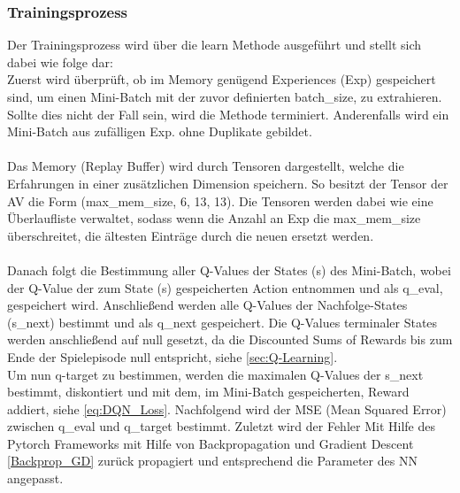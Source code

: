 \subsubsection{Trainingsprozess}
Der Trainingsprozess wird über die learn Methode ausgeführt und stellt sich dabei wie folge dar:\\
Zuerst wird überprüft, ob im Memory genügend Experiences (Exp) gespeichert sind, um einen Mini-Batch mit der zuvor definierten batch\_size, zu extrahieren. Sollte dies nicht der Fall sein, wird die Methode terminiert. Anderenfalls wird ein Mini-Batch aus zufälligen Exp. ohne Duplikate gebildet.\\
\\Das Memory (Replay Buffer) wird durch Tensoren dargestellt, welche die Erfahrungen in einer zusätzlichen Dimension speichern. So besitzt der Tensor der AV die Form (max\_mem\_size, 6, 13, 13). Die Tensoren werden dabei wie eine Überlaufliste verwaltet, sodass wenn die Anzahl an Exp die max\_mem\_size überschreitet, die ältesten Einträge durch die neuen ersetzt werden.\\
\\Danach folgt die Bestimmung aller Q-Values der States (s) des Mini-Batch, wobei der Q-Value der zum State (s) gespeicherten Action entnommen und als q\_eval, gespeichert wird. 
Anschließend werden alle Q-Values der Nachfolge-States (s\_next) bestimmt und als q\_next gespeichert. Die Q-Values terminaler States werden anschließend auf null gesetzt, da die Discounted Sums of Rewards bis zum Ende der Spielepisode null entspricht, siehe \ref{sec:Q-Learning}.\\
Um nun q-target zu bestimmen, werden die maximalen Q-Values der s\_next bestimmt, diskontiert und mit dem, im Mini-Batch gespeicherten, Reward addiert, siehe \ref{eq:DQN_Loss}.
Nachfolgend wird der MSE (Mean Squared Error) zwischen q\_eval und q\_target bestimmt. Zuletzt wird der Fehler Mit Hilfe des Pytorch Frameworks mit Hilfe von Backpropagation und Gradient Descent \ref{Backprop_GD} zurück propagiert und entsprechend die Parameter des NN angepasst.
